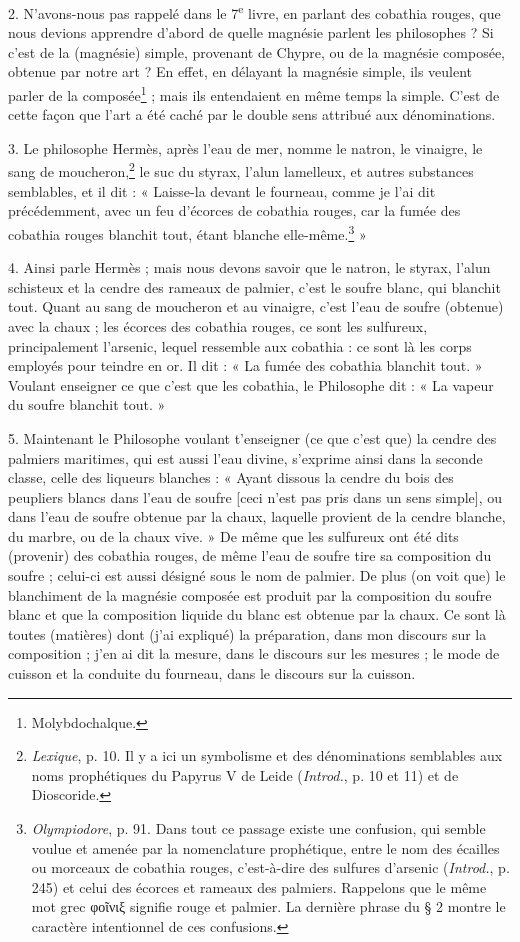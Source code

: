 \documentclass[landscape, a4paper, 11pt, oneside, polutonikogreek, french]{article}
\begin{document}
2. N'avons-nous pas rappelé dans le 7\textsuperscript{e} livre, en parlant des cobathia rouges, que nous devions apprendre d'abord de quelle magnésie parlent les philosophes ? Si c'est de la (magnésie) simple, provenant de Chypre, ou de la magnésie composée, obtenue par notre art ? En effet, en délayant la magnésie simple, ils veulent parler de la composée\footnote{Molybdochalque.} ; mais ils entendaient en même temps la simple. C'est de cette façon que l'art a été caché par le double sens attribué aux dénominations.

3. Le philosophe Hermès, après l'eau de mer, nomme le natron, le vinaigre, le sang de moucheron,\footnote{\emph{Lexique}, p. 10. Il y a ici un symbolisme et des dénominations semblables aux noms prophétiques du Papyrus V de Leide (\emph{Introd.}, p. 10 et 11) et de Dioscoride.} le suc du styrax, l'alun lamelleux, et autres substances semblables, et il dit : « Laisse-la devant le fourneau, comme je l'ai dit précédemment, avec un feu d'écorces de cobathia rouges, car la fumée des cobathia rouges blanchit tout, étant blanche elle-même.\footnote{\emph{Olympiodore}, p. 91. Dans tout ce passage existe une confusion, qui semble voulue et amenée par la nomenclature prophétique, entre le nom des écailles ou morceaux de cobathia rouges, c'est-à-dire des sulfures d'arsenic (\emph{Introd.}, p. 245) et celui des écorces et rameaux des palmiers. Rappelons que le même mot grec φοῖνιξ signifie rouge et palmier. La dernière phrase du § 2 montre le caractère intentionnel de ces confusions.} »

4. Ainsi parle Hermès ; mais nous devons savoir que le natron, le styrax, l'alun schisteux et la cendre des rameaux de palmier, c'est le soufre blanc, qui blanchit tout. Quant au sang de moucheron et au vinaigre, c'est l'eau de soufre (obtenue) avec la chaux ; les écorces des cobathia rouges, ce sont les sulfureux, principalement l'arsenic, lequel ressemble aux cobathia : ce sont là les corps employés pour teindre en or. Il dit : « La fumée des cobathia blanchit tout. » Voulant enseigner ce que c'est que les cobathia, le Philosophe dit : « La vapeur du soufre blanchit tout. »

5. Maintenant le Philosophe voulant t'enseigner (ce que c'est que) la cendre des palmiers maritimes, qui est aussi l'eau divine, s'exprime ainsi dans la seconde classe, celle des liqueurs blanches : « Ayant dissous la cendre du bois des peupliers blancs dans l'eau de soufre [ceci n'est pas pris dans un sens simple], ou dans l'eau de soufre obtenue par la chaux, laquelle provient de la cendre blanche, du marbre, ou de la chaux vive. » De même que les sulfureux ont été dits (provenir) des cobathia rouges, de même l'eau de soufre tire sa composition du soufre ; celui-ci est aussi désigné sous le nom de palmier. De plus (on voit que) le blanchiment de la magnésie composée est produit par la composition du soufre blanc et que la composition liquide du blanc est obtenue par la chaux. Ce sont là toutes (matières) dont (j'ai expliqué) la préparation, dans mon discours sur la composition ; j'en ai dit la mesure, dans le discours sur les mesures ; le mode de cuisson et la conduite du fourneau, dans le discours sur la cuisson.
\end{document}
